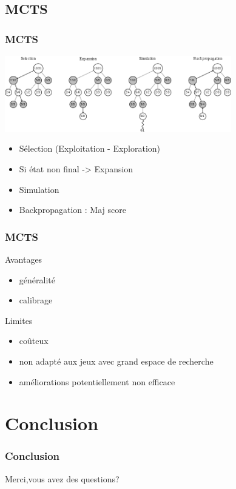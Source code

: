 \documentclass[11pt]{beamer}
\begin{document}
 \subsection{MCTS}
 \begin{frame}
 \frametitle{MCTS}
 \color{blue}
 \vspace{1cm}
 
 \includegraphics[width=280pt]{images/mcts.png}
 \vspace{0.5cm}
 \begin{itemize}
 	\item Sélection (Exploitation - Exploration)
 	\item Si  état non final -> Expansion
 	\item Simulation
 	\item Backpropagation : Maj score
 \end{itemize}
\end{frame}
\begin{frame}
\frametitle{MCTS}
Avantages
\begin{itemize}
\item généralité
\item calibrage
\end{itemize}
Limites
\begin{itemize}
\item      coûteux
\item non adapté aux jeux avec grand espace de recherche
\item améliorations potentiellement non efficace
\end{itemize}

\end{frame}
\section{Conclusion}
\begin{frame}
\frametitle{Conclusion}
\centering Merci,vous avez des questions?
\end{frame}
\end{document}
